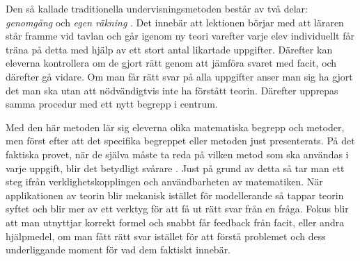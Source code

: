 \textcolor{lila}{Den så kallade traditionella undervisningsmetoden består av två delar: \textsl{genomgång} och \textsl{egen räkning} \cite{traditionellMatte}. Det innebär att lektionen börjar med att läraren står framme vid tavlan och går igenom ny teori varefter varje elev individuellt får träna på detta med hjälp av ett stort antal likartade uppgifter. Därefter kan eleverna kontrollera om de gjort rätt genom att jämföra svaret med facit, och därefter gå vidare. Om man får rätt svar på alla uppgifter anser man sig ha gjort det man ska utan att nödvändigtvis inte ha förstått teorin. Därefter upprepas samma procedur med ett nytt begrepp i centrum.} 
    
\textcolor{lila}{Med den här metoden lär sig eleverna olika matematiska begrepp och metoder, men först efter att det specifika begreppet eller metoden just presenterats. På det faktiska provet, när de själva måste ta reda på vilken metod som ska användas i varje uppgift, blir det betydligt svårare \cite{TheElephant}. }
\textcolor{WildStrawberry}{
    Just på grund av detta så tar man ett steg ifrån verklighetskopplingen och användbarheten av matematiken. När applikationen av teorin blir mekanisk istället för modellerande så tappar teorin syftet och blir mer av ett verktyg för att få ut rätt svar från en fråga. Fokus blir att man utnyttjar korrekt formel och snabbt får feedback från facit, eller andra hjälpmedel, om man fått rätt svar istället för att förstå problemet och dess underliggande moment för vad dem faktiskt innebär. }